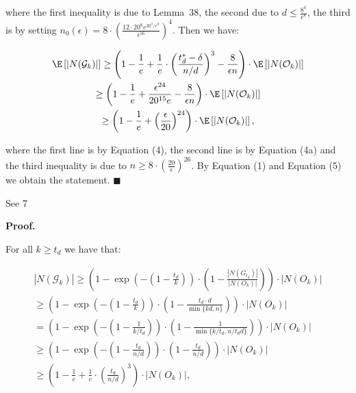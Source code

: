 \documentclass[10pt,a4paper]{article}
\begin{document}
where the first inequality is due to Lemma 38, the second due to $d\leq\frac{8^{4}}{\epsilon^{8}}$, the third is by setting $n_{0}(\epsilon)=8\cdot\left(\frac{12\cdot 20^{8}e^{20^{4}/\epsilon^{8}}}{\epsilon^{16}}\right)^{4}$.
Then we have:\par


\[\begin{gathered}
\displaystyle\E\left[|N(\mathcal{G}_{k})|\right] \displaystyle\geq\left(1-\frac{1}{e}+\frac{1}{e}\cdot\left(\frac{t^{*}_{d}-\delta}{n/d}\right)^{3}-\frac{8}{\epsilon n}\right)\cdot\E\left[|N(\mathcal{O}_{k})|\right] \\
\displaystyle\geq\left(1-\frac{1}{e}+\frac{\epsilon^{24}}{20^{15}e}-\frac{8}{\epsilon n}\right)\cdot\E\left[|N(\mathcal{O}_{k})|\right] \\
\displaystyle\geq\left(1-\frac{1}{e}+\left(\frac{\epsilon}{20}\right)^{24}\right)\cdot\E\left[|N(\mathcal{O}_{k})|\right],
\end{gathered}\]


where the first line is by Equation (4), the second line is by Equation (4a) and the third inequality is due to $n\geq 8\cdot\left(\frac{20}{\epsilon}\right)^{26}$.
By Equation (1) and Equation (5) we obtain the statement.
\ensuremath{\blacksquare}\par





See 7\par




\par\medskip\noindent\textbf{Proof.}\par



For all $k\geq t_{d}$ we have that:\par


\[\begin{gathered}
\displaystyle|N(\mathcal{G}_{k})| \displaystyle\geq\left(1-\exp\left(-\left(1-\frac{t_{d}}{k}\right)\right)\cdot\left(1-\frac{|N(G_{t_{d}})|}{|N(O_{k})|}\right)\right)\cdot|N(O_{k})| \\
\displaystyle\geq\left(1-\exp\left(-\left(1-\frac{t_{d}}{k}\right)\right)\cdot\left(1-\frac{t_{d}\cdot d}{\min\{kd,n\}}\right)\right)\cdot|N(O_{k})| \\
\displaystyle=\left(1-\exp\left(-\left(1-\frac{1}{k/t_{d}}\right)\right)\cdot\left(1-\frac{1}{\min\{k/t_{d},n/t_{d}d\}}\right)\right)\cdot|N(O_{k})| \\
\displaystyle\geq\left(1-\exp\left(-\left(1-\frac{t_{d}}{n/d}\right)\right)\cdot\left(1-\frac{t_{d}}{n/d}\right)\right)\cdot|N(O_{k})| \\
\displaystyle\geq\left(1-\frac{1}{e}+\frac{1}{e}\cdot\left(\frac{t_{d}}{n/d}\right)^{3}\right)\cdot|N(O_{k})|,
\end{gathered}\]
\end{document}
